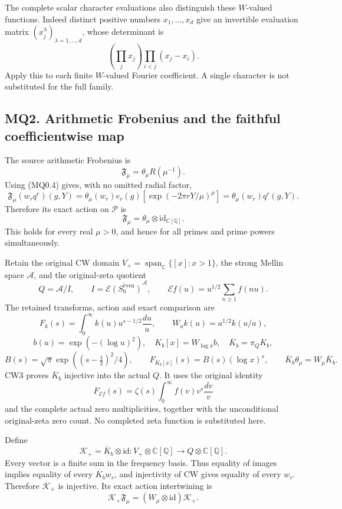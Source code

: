 The complete scalar character evaluations also distinguish these
\(W\)-valued functions. Indeed distinct positive numbers
\(x_1,\ldots,x_d\) give an invertible evaluation matrix
\((x_j^\lambda)_{\lambda=1,\ldots,d}\), whose determinant is \[
\left(\prod_jx_j\right)\prod_{i<j}(x_j-x_i).
\] Apply this to each finite \(W\)-valued Fourier coefficient. A single
character is not substituted for the full family.

\subsection{MQ2. Arithmetic Frobenius and the faithful coefficientwise
map}\label{mq2.-arithmetic-frobenius-and-the-faithful-coefficientwise-map}

The source arithmetic Frobenius is \[
\mathfrak F_\mu=\theta_\mu R(\mu^{-1}).
\] Using (MQ0.4) gives, with no omitted radial factor, \[
\mathfrak F_\mu(w_rq^r)(g,Y)
=\theta_\mu(w_r)e_r(g)
[\exp(-2\pi rY/\mu)^\mu]
=\theta_\mu(w_r)q^r(g,Y).
\tag{MQ2.1}
\] Therefore its exact action on \(\mathcal P\) is \[
\mathfrak F_\mu=\theta_\mu\otimes\mathrm{id}_{\mathbb C[\mathbb Q]}.
\tag{MQ2.2}
\] This holds for every real \(\mu>0\), and hence for all primes and
prime powers simultaneously.

Retain the original CW domain
\(V_+=\operatorname{span}_{\mathbb C}\{[x]:x>1\}\), the strong Mellin
space \(\mathcal A\), and the original-zeta quotient \[
Q=\mathcal A/I,\qquad
I=\overline{\mathcal E(S_0^{\mathrm{even}})}^{\mathcal A},\qquad
\mathcal Ef(u)=u^{1/2}\sum_{n\ge1}f(nu).
\] The retained transforms, action and exact comparison are \[
F_k(s)=\int_0^\infty k(u)u^{s-1/2}\frac{du}{u},
\qquad W_a k(u)=a^{1/2}k(u/a),
\] \[
b(u)=\exp(-(\log u)^2),\quad
K_b[x]=W_{\log x}b,\quad
\overline K_b=\pi_QK_b,
\] \[
B(s)=\sqrt\pi\exp((s-\tfrac12)^2/4),\qquad
F_{K_b[x]}(s)=B(s)(\log x)^s,\qquad
\overline K_b\theta_\mu=W_\mu\overline K_b.
\tag{MQ2.3}
\] CW3 proves \(\overline K_b\) injective into the actual \(Q\). It uses
the original identity \[
F_{\mathcal Ef}(s)
=\zeta(s)\int_0^\infty f(v)v^s\frac{dv}{v}
\] and the complete actual zero multiplicities, together with the
unconditional original-zeta zero count. No completed zeta function is
substituted here.

Define \[
\mathcal K_+=\overline K_b\otimes\mathrm{id}:
V_+\otimes\mathbb C[\mathbb Q]
\longrightarrow Q\otimes\mathbb C[\mathbb Q].
\tag{MQ2.4}
\] Every vector is a finite sum in the frequency basis. Thus equality of
images implies equality of every \(\overline K_bw_r\), and injectivity
of CW gives equality of every \(w_r\). Therefore \(\mathcal K_+\) is
injective. Its exact action intertwining is \[
\mathcal K_+\mathfrak F_\mu
=(W_\mu\otimes\mathrm{id})\mathcal K_+.
\tag{MQ2.5}
\]

